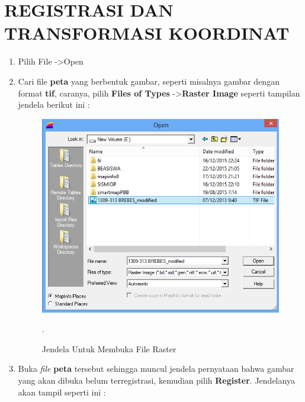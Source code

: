 \chapter{REGISTRASI DAN TRANSFORMASI KOORDINAT}

\begin{enumerate}[1.]
  \item Pilih File -\textgreater Open
  
  \item Cari file \textbf{peta} yang berbentuk gambar, seperti misalnya gambar dengan format \textbf{tif}, caranya, pilih \textbf{Files of Types} -\textgreater \textbf{Raster Image} seperti tampilan jendela berikut ini :
  
  \begin{figure}[H]
    \centering
    \includegraphics[width=1\textwidth]{./resources/048-membuka-file-raster}
    \caption{Jendela Untuk Membuka File Raster}.
  \end{figure}
  
  \item Buka \textit{file} \textbf{peta} tersebut sehingga muncul jendela pernyataan bahwa gambar yang akan dibuka belum terregistrasi, kemudian pilih \textbf{Register}. Jendelanya akan tampil seperti ini :
  

\end{enumerate}
